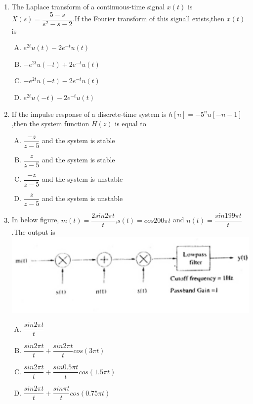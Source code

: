 \documentclass[journal,12pt,twocolumn]{IEEEtran}
\begin{document}
\begin{enumerate}
\begin{enumerate}[(A)]
\end{enumerate}

\item The Laplace transform of a continuous-time signal $x(t)$ is $X(s)=\dfrac{5-s}{s^{2}-s-2}$.If the Fourier transform of this signall exists,then $x(t)$ is
\begin{enumerate}[(A)]

\setlength\itemsep{2em}
\item $
e^{2t}u(t)-2e^{-t}u(t)
$
\item $
-e^{2t}u(-t)+2e^{-t}u(t)
$
\item $
-e^{2t}u(-t)-2e^{-t}u(t)
$
\item $
e^{2t}u(-t)-2e^{-t}u(t)
$


\end{enumerate}

\item If the impulse response of a discrete-time system is $h[n]=-5^{n}u[-n-1]$,then the system function $H(z)$ is equal to
\begin{enumerate}[(A)]

\setlength\itemsep{2em}

\item $\dfrac{-z}{z-5}$ and the system is stable
\item $
\dfrac{z}{z-5}$ and the system is stable

\item $
\dfrac{-z}{z-5}$ and the system is unstable

\item $
\dfrac{z}{z-5}$ and the system is unstable

\end{enumerate}

\item In below figure, $m(t)=\dfrac{2sin 2\pi t}{t}$,$s(t)=cos200\pi t$ and $n(t)=\dfrac{sin199\pi t}{t}$.The output is \\
\includegraphics[scale=0.45]{fig20.eps}
\begin{enumerate}[(A)]
\setlength\itemsep{2em}
\item $
\dfrac{sin 2\pi t}{t}
$
\item $
\dfrac{sin 2\pi t}{t}+\dfrac{sin 2\pi t}{t}cos(3 \pi t)
$
\item $
\dfrac{sin 2\pi t}{t}+\dfrac{sin 0.5\pi t}{t}cos(1.5 \pi t)
$
\item $
\dfrac{sin 2\pi t}{t}+\dfrac{sin \pi t}{t}cos(0.75 \pi t)
$


\end{enumerate}
\end{enumerate}
\end{document}
